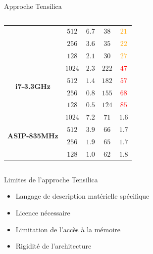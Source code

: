 \documentclass[t,compress,mathserif,12pt,xcolor=dvipsnames]{beamer}
\newcommand{\RED} [1]{\textcolor{red}{\textbf{#1}}}
\newcommand{\ORANGE} [1]{\textcolor{orange}{\textbf{#1}}}
\newcommand{\GREEN} [1]{\textcolor{dgreen}{\textbf{#1}}}
\begin{document}
\begin{frame}[c]{Approche Tensilica}
\begin{columns}
\begin{column}[T]{.48\textwidth}
{\begin{table}[t]
{{\begin{tabular}{c|c|c|c|c}
		                                     & $512$    & $6.7$ & $38$  & \ORANGE{$21$} \\

		                                     & $256$    & $3.6$ & $35$  & \ORANGE{$22$}\\

		                                     & $128$    & $2.1$ & $30$  & \ORANGE{$27$}\\

		    \midrule

		    \multirow{4}{*}{\bf i7-3.3GHz}   & $1024$   & $2.3$ & $222$ & \RED{$47$} \\

		                                     & $512$    & $1.4$ & $182$ & \RED{$57$} \\

		                                     & $256$    & $0.8$ & $155$ & \RED{$68$}\\

		                                     & $128$    & $0.5$ & $124$ & \RED{$85$}\\

		    \midrule

		    \multirow{4}{*}{\bf ASIP-835MHz} & $1024$   & $7.2$ & $71$  & \GREEN{$1.6$} \\

		                                     & $512$    & $3.9$ & $66$  & \GREEN{$1.7$} \\

		                                     & $256$    & $1.9$ & $65$  & \GREEN{$1.7$}\\

		                                     & $128$    & $1.0$ & $62$  & \GREEN{$1.8$}\\
		    \bottomrule
		  \end{tabular}
			}}
		\end{table}
		}
		\end{column}
	\end{columns}
\vfill
\centering
\end{frame}


\begin{frame}[c]{Limites de l'approche Tensilica}
	\begin{itemize}
		\item Langage de description matérielle spécifique
		\item Licence nécessaire
		\item Limitation de l'accès à la mémoire
		\item Rigidité de l'architecture
	\end{itemize}
\end{frame}
\end{document}
